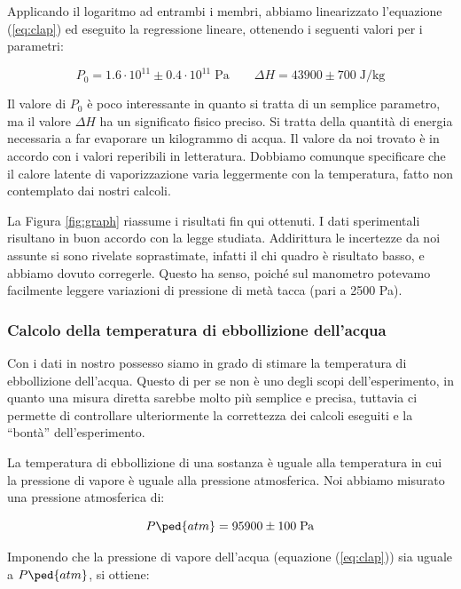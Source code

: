 Applicando il logaritmo ad entrambi i membri, abbiamo linearizzato l'equazione (\ref{eq:clap}) ed eseguito la regressione lineare, ottenendo i seguenti valori per i parametri:

\begin{equation}
    P_0 = 1.6 \cdot 10^{11} \pm 0.4 \cdot 10^{11} \; \si{\pascal} \qquad \Delta H = 43900 \pm  700 \; \si{\joule\per\kilo\gram} 
\end{equation}

Il valore di $P_0$ è poco interessante in quanto si tratta di un semplice parametro, ma il valore
$\Delta H$ ha un significato fisico preciso. Si tratta della quantità di energia necessaria a far evaporare un kilogrammo
di acqua. Il valore da noi trovato è in accordo con i valori reperibili in letteratura. Dobbiamo
comunque specificare che il calore latente di vaporizzazione varia leggermente con la temperatura,
fatto non contemplato dai nostri calcoli.

La Figura \ref{fig:graph} riassume i risultati fin qui ottenuti. I dati sperimentali risultano in buon accordo
con la legge studiata. Addirittura le incertezze da noi assunte si sono rivelate soprastimate, infatti
il chi quadro è risultato basso, e abbiamo dovuto corregerle. Questo ha senso, poiché sul manometro potevamo facilmente
leggere variazioni di pressione di metà tacca (pari a 2500 \si{\pascal}).


\subsubsection{Calcolo della temperatura di ebbollizione dell'acqua}

Con i dati in nostro possesso siamo in grado di stimare la temperatura di ebbollizione dell'acqua.
Questo di per se non è uno degli scopi dell'esperimento, in quanto una misura diretta sarebbe molto
più semplice e precisa, tuttavia ci permette di controllare ulteriormente la correttezza dei calcoli
eseguiti e la ``bontà'' dell'esperimento.

La temperatura di ebbollizione di una sostanza è uguale alla temperatura in cui la pressione di vapore
è uguale alla pressione atmosferica. Noi abbiamo misurato una pressione atmosferica di:

\begin{equation}
    P\ped{atm} =  95900 \pm 100 \; \si{\pascal}
\end{equation}

Imponendo che la pressione di vapore dell'acqua (equazione (\ref{eq:clap})) sia uguale a $P\ped{atm}$, si ottiene:

